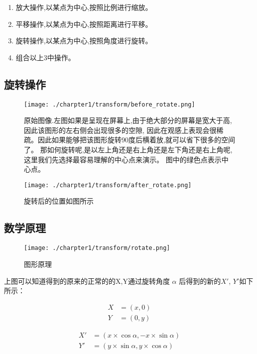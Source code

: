 \begin{enumerate}
	\item 放大操作,以某点为中心,按照比例进行缩放。
	\item 平移操作,以某点为中心,按照距离进行平移。
	\item 旋转操作,以某点为中心,按照角度进行旋转。
	\item 组合以上3中操作。
\end{enumerate}

\subsection{旋转操作}

\begin{SCfigure}
	\centering
	\caption{原始图像.左图如果是呈现在屏幕上,由于绝大部分的屏幕是宽大于高,因此该图形的左右侧会出现很多的空隙,
		因此在观感上表现会很稀疏。因此如果能够把该图形旋转90度后横着放,就可以省下很多的空间了。
		那如何旋转呢,是以左上角还是右上角还是左下角还是右上角呢,这里我们先选择最容易理解的中心点来演示。
		图中的绿色点表示中心点。}
	\texttt{[image: ./charpter1/transform/before\_rotate.png]}
\end{SCfigure}

\begin{figure}[!htb]
	\centering
	\caption{旋转后的位置如图所示}
	\texttt{[image: ./charpter1/transform/after\_rotate.png]}
\end{figure}

\subsection{数学原理}
\begin{figure}[!htb]
	\centering
	\caption{图形原理}
	\texttt{[image: ./charpter1/transform/rotate.png]}
\end{figure}

上图可以知道得到的原来的正常的的X,Y通过旋转角度 $\alpha$ 后得到的新的$X'$, $Y'$如下所示：

\begin{subequations}
	\begin{align}
		X & =(x, 0) \\
		Y & =(0, y)
	\end{align}
\end{subequations}

\begin{subequations}
	\begin{align}
		X' & =(x \times \cos \alpha, -x \times \sin \alpha) \\
		Y' & =(y \times \sin \alpha, y \times \cos \alpha)
	\end{align}
\end{subequations}

